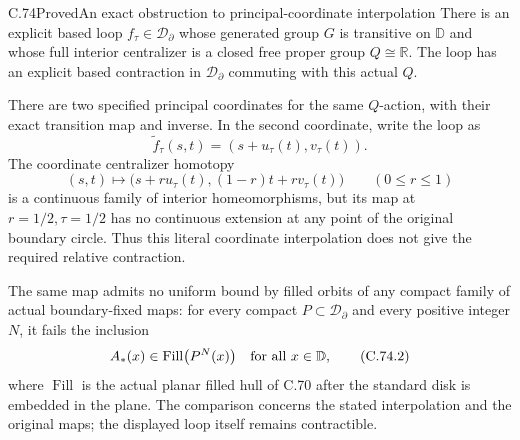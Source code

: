 \begin{claim}{C.74}{Proved}{An exact obstruction to principal-coordinate interpolation}
There is an explicit based loop
$f_\tau\in\mathcal D_\partial$ whose generated group
$G$ is transitive on $\mathbb D$ and whose full
interior centralizer is a closed free proper group
$Q\cong\mathbb R$. The loop has an explicit based
contraction in $\mathcal D_\partial$ commuting with
this actual $Q$.

There are two specified principal coordinates for
the same $Q$-action, with their exact transition
map and inverse. In the second coordinate, write
the loop as
\[
        \widetilde f_\tau(s,t)
                  =(s+u_\tau(t),v_\tau(t)).
\]
The coordinate centralizer homotopy
\[
 (s,t)\longmapsto
       \bigl(s+r u_\tau(t),(1-r)t+r v_\tau(t)\bigr)
             \qquad(0\leq r\leq1)                       \tag{C.74.1}
\]
is a continuous family of interior homeomorphisms,
but its map at $r=1/2,\tau=1/2$ has no continuous
extension at any point of the original boundary
circle. Thus this literal coordinate interpolation
does not give the required relative contraction.

The same map admits no uniform bound by filled
orbits of any compact family of actual
boundary-fixed maps: for every compact
$P\subset\mathcal D_\partial$ and every positive
integer $N$, it fails the inclusion
\[
       A_*(x)\in\operatorname{Fill}\bigl(P^N(x)\bigr)
                         \quad\hbox{for all }x\in\mathbb D,
                                                               \tag{C.74.2}
\]
where $\operatorname{Fill}$ is the actual planar
filled hull of C.70 after the standard disk is
embedded in the plane. The comparison concerns
the stated interpolation and the original maps;
the displayed loop itself remains contractible.
\end{claim}


